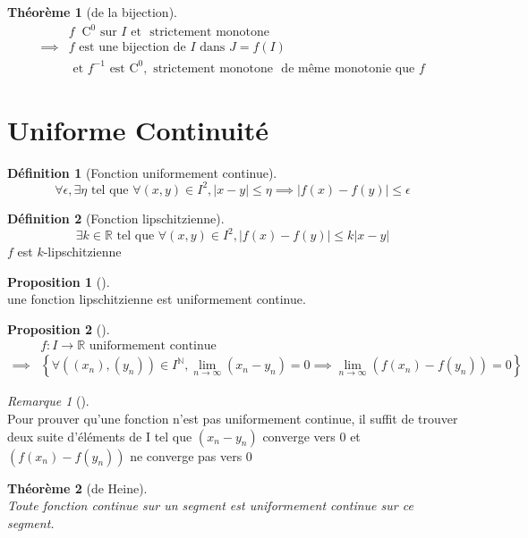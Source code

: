 \documentclass{article}
\newcommand{\R}{\mathbb{R}}
\newcommand{\N}{\mathbb{N}}
\newcommand{\et}{\text{ et }}
\newcommand{\tq}{\text{ tel que }}
\newcommand{\lm}{\lim\limits}
\newcommand{\co}[1]{\mathrm{C^{#1}}}
\newcommand{\lminf}{\lm_{n \to \infty}}
\newcommand{\est}{\text{ est }}
\newcommand{\strmo}{\text{ strictement monotone }}
\newcommand{\sur}{\text{ sur }}
\theoremstyle{definition}
\newtheorem*{prop}{Proposition}
\newtheorem*{defin}{Définition}
\theoremstyle{remark}
\newtheorem*{rema}{Remarque}
\theoremstyle{plain}
\newtheorem*{them}{Théorème}
\newenvironment{prp}[1][]
{\begin{prop}[#1]\quad\\}
{\end{prop}}
\newenvironment{dfn}[1][]
{\begin{defin}[#1]\quad\\}
{\end{defin}}
\newenvironment{rem}[1][]
{\begin{rema}[#1]\quad\\}
{\end{rema}}
\newenvironment{thm}[1][]
{\begin{them}[#1]\quad\\}
{\end{them}}
\begin{document}
\begin{thm}[de la bijection]
\begin{align*}
            &f \;\; \co{0} \sur I \et \!\! \strmo \\ 
\implies    &f \text{ est une bijection de } I \text{ dans } J = f(I) \\
            &\!\! \et f^{-1} \est \co{0}, \strmo \!\! 
                \text{ de même monotonie que } f
\end{align*}
\end{thm}

\section{Uniforme Continuité}

\begin{dfn}[Fonction uniformement continue]
\[
\forall \epsilon, \exists \eta \tq \forall (x, y) \in I^2,
|x - y| \leq \eta \implies |f(x) - f(y)| \leq \epsilon
\]
\end{dfn}

\begin{dfn}[Fonction lipschitzienne]
\[
    \exists k \in \R \tq \forall (x, y) \in I^2, |f(x) - f(y)| \leq k|x - y|
\]
$f$ est $k$-lipschitzienne
\end{dfn}

\begin{prp}
une fonction lipschitzienne est uniformement continue.
\end{prp}

\begin{prp}
\begin{align*}
            &f : I \to \R \text{ uniformement continue } \\
\implies    &\left \{ \forall ((x_n), (y_n)) \in I^\N, \lminf (x_n - y_n) = 0
            \implies \lminf (f(x_n) - f(y_n)) = 0 \right \}
\end{align*}
\end{prp}

\begin{rem}
Pour prouver qu'une fonction n'est pas uniformement continue,
il suffit de trouver deux suite d'éléments de I tel que
$(x_n - y_n)$ converge vers 0 et $(f(x_n) - f(y_n))$ ne converge
pas vers 0
\end{rem}

\begin{thm}[de Heine]
Toute fonction continue sur un segment est uniformement continue sur
ce segment.
\end{thm}
\end{document}
